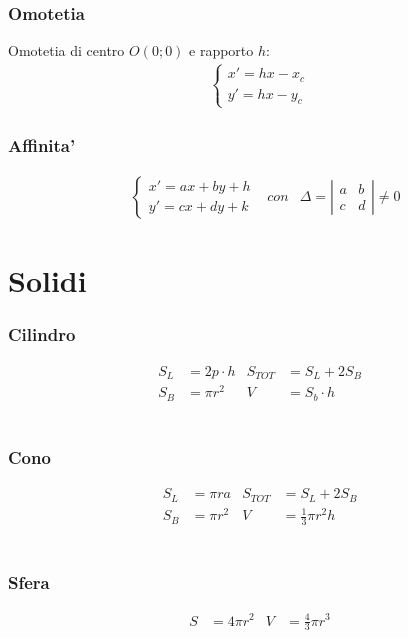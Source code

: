 \documentclass[a4paper]{article}
\begin{document}
	\subsubsection{Omotetia}
	Omotetia di centro $O(0;0)$ e rapporto $h$:
		\begin{align*}
	\begin{cases}
	x' = hx - x_c\\
	y' = hx - y_c
	\end{cases}
	\end{align*}
	\subsubsection{Affinita'}
	\begin{align*}
		&\begin{cases}
			x'=ax+by+h\\
			y'=cx+dy+k
		\end{cases}&
		con &\varDelta = \left| \begin{matrix}
		a & b \\ 
		c & d
		\end{matrix}
		\right|\neq 0
	\end{align*}
	
	\newpage
	\section{Solidi}
	\subsubsection{Cilindro}
	\begin{align*}
		S_L & = 2p \cdot h & S_{TOT} & = S_L + 2S_B  \\
		S_B & = \pi r^2    & V       & = S_b \cdot h
	\end{align*}
	\\
	\subsubsection{Cono}
	\begin{align*}
		S_L & = \pi r a & S_{TOT} & = S_L + 2S_B            \\
		S_B & = \pi r^2 & V       & = \frac{1}{3} \pi r^2 h
	\end{align*}
	\\
	\subsubsection{Sfera}
	\begin{align*}
		S &= 4\pi r^2 & V &= \frac{4}{3} \pi r^3
	\end{align*}
	\\
\end{document}
